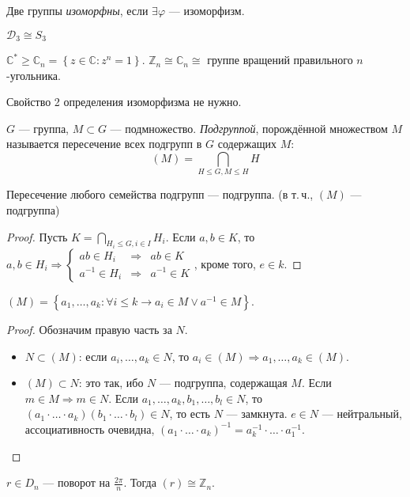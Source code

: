 \begin{define*}
  Две группы \emph{изоморфны}, если $\exists \varphi$ --- изоморфизм.
\end{define*}

\begin{example}
  $\mathcal{D}_3 \cong S_3$
\end{example}

\begin{example}
  $\mathbb{C}^* \ge \mathbb{C}_n = \left\{ z \in \mathbb{C}: z^n = 1 \right\}$. 
  $\mathbb{Z}_n \cong \mathbb{C}_n \cong$ группе вращений правильного $n$-угольника.
\end{example}

\begin{exercise}
  Свойство 2 определения изоморфизма не нужно.
\end{exercise}

\begin{define*}
  $G$ --- группа, $M \subset G$ --- подмножество. \emph{Подгруппой}, порождённой множеством $M$ называется пересечение всех подгрупп в $G$ содержащих $M$:
  $$(M) = \bigcap_{H\le G, M\le H}H$$
\end{define*}

\begin{claim}
  Пересечение любого семейства подгрупп --- подгруппа. (в т.\,ч., $(M)$ --- подгруппа)
\end{claim}

\begin{proof}
  Пусть $K = \underset{H_i \le G, i \in I}{\bigcap}H_i$. Если $a, b \in K$, то 
  $a, b \in H_i \Rightarrow 
  \left\{ 
	\begin{aligned}
	  ab \in H_i &\Rightarrow& ab \in K\\ 
	  a^{-1} \in H_i &\Rightarrow& a^{-1} \in K
	\end{aligned}
  \right.$, кроме того, $e \in k$.
\end{proof}

\begin{claim}
  $(M) = \left\{ a_1, \ldots, a_k: \forall i \le k \to a_i \in M \lor a^{-1} \in M \right\}$.
\end{claim}

\begin{proof}
  Обозначим правую часть за $N$.

  \begin{itemize}
	\item $N \subset (M)$: если $a_i, \ldots, a_k \in N$, то $a_i \in (M) \Rightarrow a_1, \ldots, a_k \in (M)$.
	\item $(M) \subset N$: это так, ибо $N$ --- подгруппа, содержащая $M$.
		Если $m\in M\Rightarrow m\in N$. Если $a_{1},\ldots,a_{k},b_{1},\ldots,b_{l}\in N$,
		то $\left(a_{1}\cdot\ldots\cdot a_{k}\right)\left(b_{1}\cdot\ldots\cdot b_{l}\right)\in N$,
		то есть $N$ --- замкнута. $e\in N$ --- нейтральный, ассоциативность
		очевидна, $\left(a_{1}\cdot\ldots\cdot a_{k}\right)^{-1}=a_{k}^{-1}\cdot\ldots\cdot a_{1}^{-1}$.
  \end{itemize}
\end{proof}

\begin{example}
  $r\in D_{n}$ --- поворот на $\frac{2\pi}{n}$. Тогда $\left(r\right)\cong\mathbb{Z}_{n}$.
\end{example}



